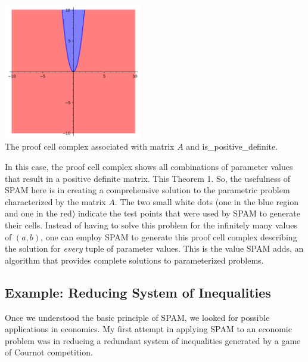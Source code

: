 \documentclass{article}
\begin{document}
\begin{center}
    \includegraphics[width=6cm]{posdef_graph.png} \\
    \caption{The proof cell complex associated with matrix $A$ and {\selectfont is\_positive\_definite.}}
\end{center}
\vspace{20pt}

In this case, the proof cell complex shows all combinations of parameter values that result in a positive definite matrix. This  Theorem 1. So, the usefulness of SPAM here is in creating a comprehensive solution to the parametric problem characterized by the matrix $A$. The two small white dots (one in the blue region and one in the red) indicate the test points that were used by SPAM to generate their cells. Instead of having to solve this problem for the infinitely many values of $(a,b)$, one can employ SPAM to generate this proof cell complex describing the solution for \textit{every} tuple of parameter values. This is the value SPAM adds, an algorithm that provides complete solutions to parameterized problems. 

\subsection{Example: Reducing System of Inequalities}

Once we understood the basic principle of SPAM, we looked for possible applications in economics. My first attempt in applying SPAM to an economic problem was in reducing a redundant system of inequalities generated by a game of Cournot competition. 
\end{document}
